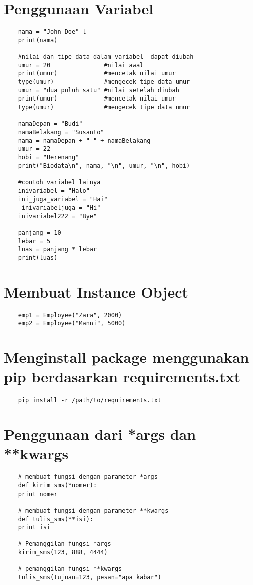 \documentclass[12pt]{article} %
\begin{document}
\section{Penggunaan Variabel}
\begin{lstlisting}
	nama = "John Doe" l
	print(nama)
	
	#nilai dan tipe data dalam variabel  dapat diubah
	umur = 20               #nilai awal
	print(umur)             #mencetak nilai umur
	type(umur)              #mengecek tipe data umur
	umur = "dua puluh satu" #nilai setelah diubah
	print(umur)             #mencetak nilai umur
	type(umur)              #mengecek tipe data umur
	
	namaDepan = "Budi"
	namaBelakang = "Susanto"
	nama = namaDepan + " " + namaBelakang
	umur = 22
	hobi = "Berenang"
	print("Biodata\n", nama, "\n", umur, "\n", hobi)
	
	#contoh variabel lainya
	inivariabel = "Halo"
	ini_juga_variabel = "Hai"
	_inivariabeljuga = "Hi"
	inivariabel222 = "Bye" 
	
	panjang = 10
	lebar = 5
	luas = panjang * lebar
	print(luas)
\end{lstlisting}

\section{Membuat Instance Object}
\begin{lstlisting}
	emp1 = Employee("Zara", 2000)
	emp2 = Employee("Manni", 5000)
\end{lstlisting}

\section {Menginstall package menggunakan pip berdasarkan requirements.txt}
\begin{lstlisting}
	pip install -r /path/to/requirements.txt
\end{lstlisting}

\section{Penggunaan dari *args dan **kwargs}
\begin{lstlisting}
	# membuat fungsi dengan parameter *args
	def kirim_sms(*nomer):
	print nomer
	
	# membuat fungsi dengan parameter **kwargs
	def tulis_sms(**isi):
	print isi
	
	# Pemanggilan fungsi *args
	kirim_sms(123, 888, 4444)
	
	# pemanggilan fungsi **kwargs
	tulis_sms(tujuan=123, pesan="apa kabar")
\end{lstlisting}
\end{document}
